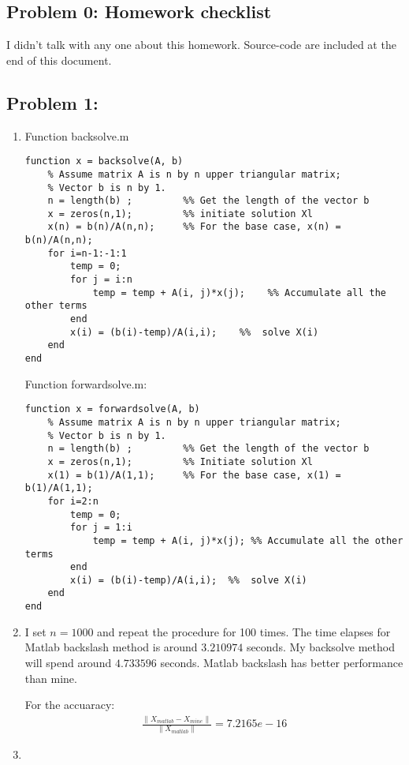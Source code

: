 \documentclass{article}
\begin{document}
 



\hypertarget{problem_0_homework_checklist_2}{}
\subsection*{{Problem 0: Homework checklist}}
\label{problem_0_homework_checklist_2}

\checkmark	I didn't talk with any one about this homework. \newline
\checkmark 	Source-code are included at the end of this document. 

\hypertarget{}{}
\subsection*{{Problem 1:}}
\label{}
\begin{enumerate}

\item 
Function backsolve.m
\begin{lstlisting} 
function x = backsolve(A, b) 
    % Assume matrix A is n by n upper triangular matrix; 
    % Vector b is n by 1. 
    n = length(b) ;         %% Get the length of the vector b
    x = zeros(n,1);         %% initiate solution Xl 
    x(n) = b(n)/A(n,n);     %% For the base case, x(n) = b(n)/A(n,n); 
    for i=n-1:-1:1
        temp = 0;           
        for j = i:n 
            temp = temp + A(i, j)*x(j);    %% Accumulate all the other terms
        end 
        x(i) = (b(i)-temp)/A(i,i);    %%  solve X(i)
    end 
end
\end{lstlisting} 

Function forwardsolve.m: 
\begin{lstlisting} 
function x = forwardsolve(A, b) 
    % Assume matrix A is n by n upper triangular matrix; 
    % Vector b is n by 1. 
    n = length(b) ;         %% Get the length of the vector b
    x = zeros(n,1);         %% Initiate solution Xl 
    x(1) = b(1)/A(1,1);     %% For the base case, x(1) = b(1)/A(1,1); 
    for i=2:n
        temp = 0; 
        for j = 1:i 
            temp = temp + A(i, j)*x(j); %% Accumulate all the other terms
        end 
        x(i) = (b(i)-temp)/A(i,i);  %%  solve X(i)
    end 
end

\end{lstlisting} 

\item 
 
 I set $n=1000$ and repeat the procedure for 100 times. The time elapses for  Matlab backslash method is around $3.210974$ seconds.  My backsolve method will spend around $4.733596 $ seconds.  Matlab backslash has better performance than mine. 
 
 For the accuaracy: 
 \begin{align} 
\frac{ \|X_{matlab} - X_{mine} \| }{\|X_{matlab} \| }=  7.2165e-16
 \end{align} 
 
\item 



\end{enumerate}
\end{document}
